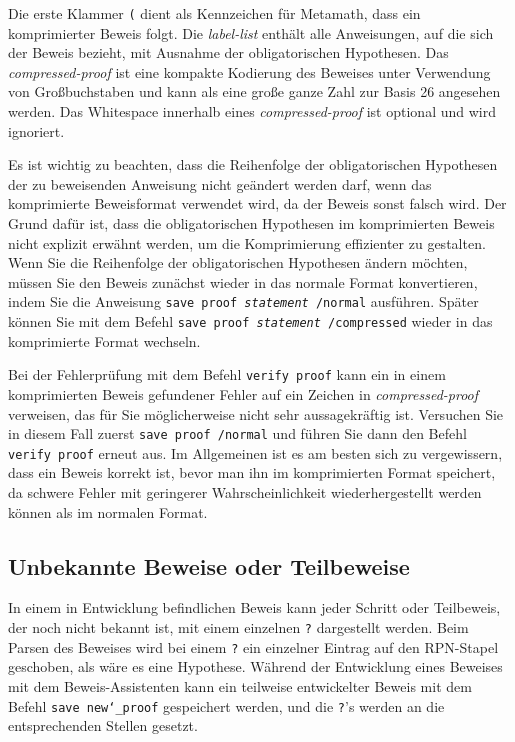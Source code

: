 Die  erste Klammer \texttt{(} dient als Kennzeichen für Metamath, dass ein komprimierter Beweis folgt.  Die {\em label-list} enthält alle Anweisungen, auf die sich der Beweis bezieht, mit Ausnahme der obligatorischen Hypothesen.  Das {\em compressed-proof} ist eine kompakte Kodierung des Beweises unter Verwendung von Großbuchstaben und kann als eine große ganze Zahl zur Basis 26 angesehen werden.  Das Whitespace innerhalb eines {\em compressed-proof} ist optional und wird ignoriert.

Es ist wichtig zu beachten, dass die Reihenfolge der obligatorischen Hypothesen der zu beweisenden Anweisung nicht geändert werden darf, wenn das komprimierte Beweisformat verwendet wird, da der Beweis sonst falsch wird.  Der Grund dafür ist, dass die obligatorischen Hypothesen im komprimierten Beweis nicht explizit erwähnt werden, um die Komprimierung effizienter zu gestalten. Wenn Sie die Reihenfolge der obligatorischen Hypothesen ändern möchten, müssen Sie den Beweis zunächst wieder in das normale Format konvertieren, indem Sie die Anweisung \texttt{save proof {\em statement} /normal} ausführen. Später können Sie mit dem Befehl \texttt{save proof {\em statement} /compressed} wieder in das komprimierte Format wechseln. 

Bei der Fehlerprüfung mit dem Befehl \texttt{verify proof} kann ein in einem komprimierten Beweis gefundener Fehler auf ein Zeichen in {\em compressed-proof} verweisen, das für Sie möglicherweise nicht sehr aussagekräftig ist.  Versuchen Sie in diesem Fall zuerst \texttt{save proof /normal} und führen Sie dann den Befehl \texttt{verify proof} erneut aus.  Im Allgemeinen ist es am besten sich zu vergewissern, dass ein Beweis korrekt ist, bevor man ihn im komprimierten Format speichert, da schwere Fehler mit geringerer Wahrscheinlichkeit wiederhergestellt werden können als im normalen Format. 

\subsection{Unbekannte Beweise oder Teilbeweise}\label{unknown}

In einem in Entwicklung befindlichen Beweis kann jeder Schritt oder Teilbeweis, der noch nicht bekannt ist, mit einem einzelnen \texttt{?} dargestellt werden.  Beim Parsen des Beweises wird bei einem \texttt{?}\index{\texttt{]}@\texttt{?}\ innerhalb von Beweisen} ein einzelner Eintrag auf den RPN-Stapel geschoben, als wäre es eine Hypothese.  Während der Entwicklung eines Beweises mit dem Beweis-Assistenten kann ein teilweise entwickelter Beweis mit dem Befehl \texttt{save new{\char`\_}proof} gespeichert werden, und die \texttt{?}'s werden an die entsprechenden Stellen gesetzt. 


